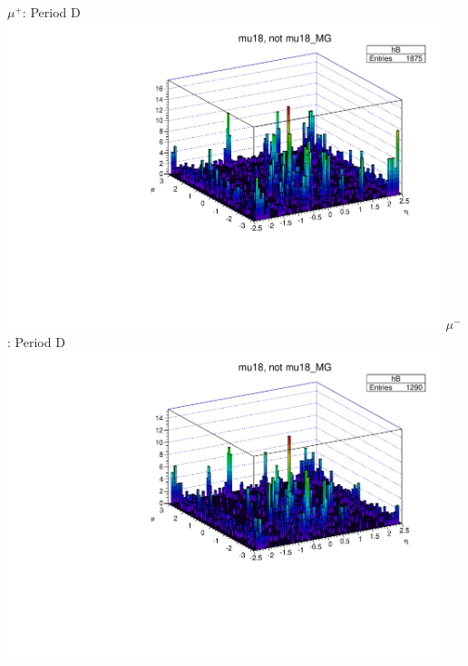  {
\colb[T]
$\mu^+$: Period D
\centering
\includegraphics[width=0.95\textwidth]{dates/20130306/figures/mu18/dump_MG_dataD_w_POS.dat__MUID_NOT_MG}
$\mu^-$: Period D
\centering
\includegraphics[width=0.95\textwidth]{dates/20130306/figures/mu18/dump_MG_dataD_w_NEG.dat__MUID_NOT_MG}
\cole
}

